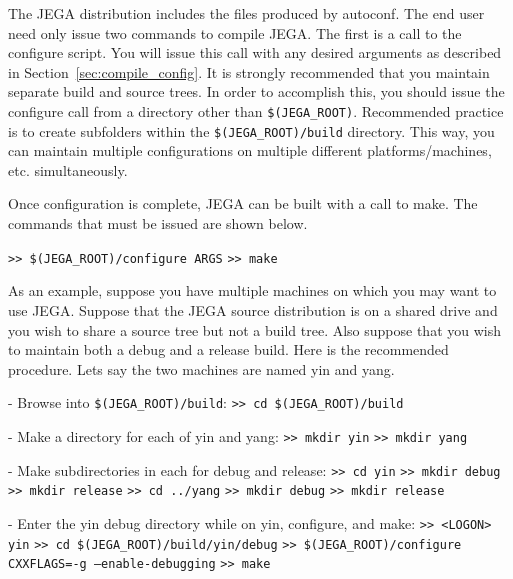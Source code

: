 The JEGA distribution includes the files produced by autoconf.  The
end user need only issue two commands to compile JEGA.  The first is
a call to the configure script.  You will issue this call with any
desired arguments as described in Section~\ref{sec:compile_config}.
It is strongly recommended that you maintain separate build and
source trees.  In order to accomplish this, you should issue the
configure call from a directory other than \texttt{\$(JEGA\_ROOT)}.
Recommended practice is to create subfolders within the
\texttt{\$(JEGA\_ROOT)/build} directory.  This way, you can maintain
multiple configurations on multiple different platforms/machines,
etc. simultaneously.

Once configuration is complete, JEGA can be built with a call to
make.  The commands that must be issued are shown below.

\texttt{>> \$(JEGA\_ROOT)/configure ARGS}\newline
\texttt{>> make}

As an example, suppose you have multiple machines on which you may
want to use JEGA.  Suppose that the JEGA source distribution is on a
shared drive and you wish to share a source tree but not a build
tree. Also suppose that you wish to maintain both a debug and a
release build.  Here is the recommended procedure. Lets say the two
machines are named yin and yang.

- Browse into \texttt{\$(JEGA\_ROOT)/build}:\newline
    \texttt{>> cd \$(JEGA\_ROOT)/build}\newline

- Make a directory for each of yin and yang:\newline
    \texttt{>> mkdir yin}\newline
    \texttt{>> mkdir yang}\newline

- Make subdirectories in each for debug and release:\newline
    \texttt{>> cd yin}\newline
    \texttt{>> mkdir debug}\newline
    \texttt{>> mkdir release}\newline
    \texttt{>> cd ../yang}\newline
    \texttt{>> mkdir debug}\newline
    \texttt{>> mkdir release}\newline

- Enter the yin debug directory while on yin, configure, and make:\newline
    \texttt{>> <LOGON> yin}\newline
    \texttt{>> cd \$(JEGA\_ROOT)/build/yin/debug}\newline
    \texttt{>> \$(JEGA\_ROOT)/configure CXXFLAGS=-g --enable-debugging}\newline
    \texttt{>> make}\newline

